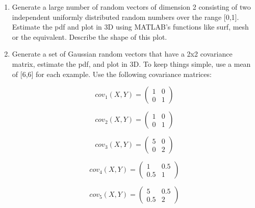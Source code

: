 \begin{enumerate}
\item Generate a large number of random vectors of dimension 2 consisting of two independent uniformly
distributed random numbers over the range [0,1]. Estimate the pdf and plot in 3D using MATLAB's
functions like surf, mesh or the equivalent. Describe the shape of this plot.
\item Generate a set of Gaussian random vectors that have a 2x2 covariance matrix, estimate the pdf, and
plot in 3D. To keep things simple, use a mean of [6,6] for each example. Use the following covariance
matrices:

\begin{equation} 
cov_1(X,Y) = \left(\begin{matrix}
                     1 & 0 \\
                     0 & 1 
                 \end{matrix}\right)
\end{equation} 

\begin{equation} 
cov_2(X,Y) = \left(\begin{matrix}
                     1 & 0 \\
                     0 & 1 
                 \end{matrix}\right)
\end{equation} 

\begin{equation} 
cov_3(X,Y) = \left(\begin{matrix}
                     5 & 0 \\
                     0 & 2 
                 \end{matrix}\right)
\end{equation} 

\begin{equation} 
cov_4(X,Y) = \left(\begin{matrix}
                     1 & 0.5 \\
                     0.5 & 1 
                 \end{matrix}\right)
\end{equation} 

\begin{equation} 
cov_5(X,Y) = \left(\begin{matrix}
                     5 & 0.5 \\
                     0.5 & 2 
                 \end{matrix}\right)
\end{equation} 

\end{enumerate}
